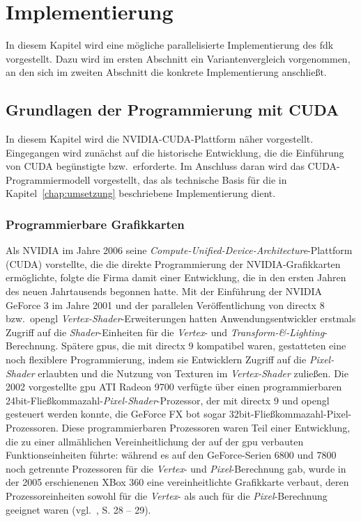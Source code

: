 \chapter{Implementierung}\label{chap:implementierung}

In diesem Kapitel wird eine mögliche parallelisierte Implementierung des \gls{fdk} vorgestellt. Dazu wird im ersten
Abschnitt ein Variantenvergleich vorgenommen, an den sich im zweiten Abschnitt die konkrete Implementierung anschließt.

\section{Grundlagen der Programmierung mit CUDA}\label{sec:grundlagen_cuda}

In diesem Kapitel wird die NVIDIA-CUDA-Plattform näher vorgestellt. Eingegangen wird zunächst auf die historische
Entwicklung, die die Einführung von CUDA begünstigte bzw.\ erforderte. Im Anschluss daran wird das CUDA-Programmiermodell
vorgestellt, das als technische Basis für die in Kapitel~\ref{chap:umsetzung} beschriebene Implementierung dient.

\subsection{Programmierbare Grafikkarten}\label{ssec:cu_prog_gpu}

Als NVIDIA im Jahre 2006 seine \textit{Compute-Unified-Device-Architecture}-Plattform (CUDA) vorstellte, die die
direkte Programmierung der NVIDIA-Grafikkarten ermöglichte, folgte die Firma damit einer Entwicklung, die in den ersten
Jahren des neuen Jahrtausends begonnen hatte. Mit der Einführung der NVIDIA GeForce 3 im Jahre 2001 und der parallelen
Veröffentlichung von \gls{directx} 8 bzw.\ \gls{opengl} \textit{Vertex-Shader}-Erweiterungen hatten Anwendungsentwickler
erstmals Zugriff auf die \textit{Shader}-Einheiten für die \textit{Vertex}- und
\textit{Transform-\&-Lighting}-Berechnung. Spätere \gls{gpu}s, die mit \gls{directx} 9 kompatibel waren, gestatteten
eine noch flexiblere Programmierung, indem sie Entwicklern Zugriff auf die \textit{Pixel-Shader} erlaubten und die
Nutzung von Texturen im \textit{Vertex-Shader} zuließen. Die 2002 vorgestellte \gls{gpu} ATI Radeon 9700 verfügte über
einen programmierbaren 24bit-Fließkommazahl-\textit{Pixel-Shader}-Prozessor, der mit \gls{directx} 9 und \gls{opengl}
gesteuert werden konnte, die GeForce FX bot sogar 32bit-Fließkommazahl-Pixel-Prozessoren. Diese programmierbaren
Prozessoren waren Teil einer Entwicklung, die zu einer allmählichen Vereinheitlichung der auf der \gls{gpu} verbauten
Funktionseinheiten führte: während es auf den GeForce-Serien 6800 und 7800 noch getrennte Prozessoren für die
\textit{Vertex}- und \textit{Pixel}-Berechnung gab, wurde in der 2005 erschienenen XBox 360 eine
{\glqq}vereinheitlichte{\grqq} Grafikkarte verbaut, deren Prozessoreinheiten sowohl für die \textit{Vertex}- als auch
für die \textit{Pixel}-Berechnung geeignet waren (vgl.~\cite{kirkhwu}, S. 28 -- 29).

